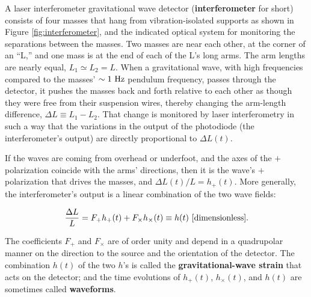 \documentclass[a4paper,10pt]{article}
\begin{document}
{\noindent}A laser interferometer gravitational wave detector (\textbf{interferometer} for short) consists of four masses that hang from vibration-isolated supports as shown in Figure \ref{fig:interferometer}, and the indicated optical system for monitoring the separations between the masses. Two masses are near each other, at the corner of an ``L,'' and one mass is at the end of each of the L's long arms. The arm lengths are nearly equal, $L_1\simeq L_2=L$. When a gravitational wave, with high frequencies compared to the masses' $\sim1\,\,{\rm Hz}$ pendulum frequency, passes through the detector, it pushes the masses back and forth relative to each other as though they were free from their suspension wires, thereby changing the arm-length difference, $\Delta L\equiv L_1-L_2$. That change is monitored by laser interferometry in such a way that the variations in the output of the photodiode (the interferometer's output) are directly proportional to $\Delta L(t)$.

{\noindent}If the waves are coming from overhead or underfoot, and the axes of the $+$ polarization coincide with the arms' directions, then it is the wave's $+$ polarization that drives the masses, and $\Delta L(t)/L=h_+(t)$. More generally, the interferometer's output is a linear combination of the two wave fields:

\begin{align*}
    \frac{\Delta L}{L} = F_+h_+(t) + F_\times h_\times(t) \equiv h(t) ~ [{\rm dimensionless}].
\end{align*}

{\noindent}The coefficients $F_+$ and $F_\times$ are of order unity and depend in a quadrupolar manner on the direction to the source and the orientation of the detector. The combination $h(t)$ of the two $h$'s is called the \textbf{gravitational-wave strain} that acts on the detector; and the time evolutions of $h_+(t)$, $h_\times(t)$, and $h(t)$ are sometimes called \textbf{waveforms}.
\end{document}
